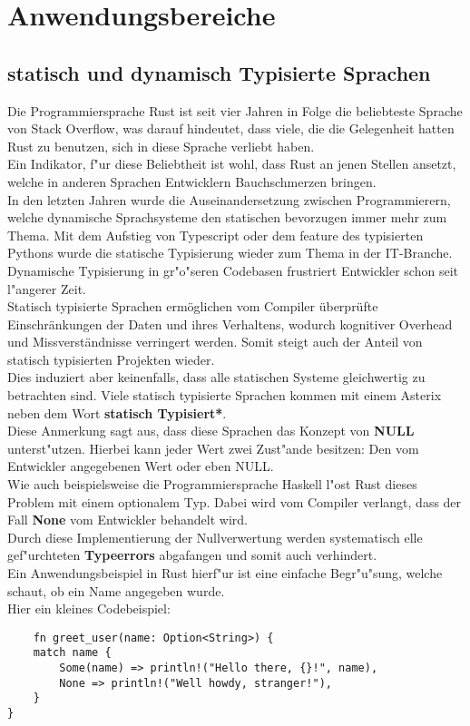 \chapter{Anwendungsbereiche} %
\label{cha:Anwendungsbereiche}
\section{statisch und dynamisch Typisierte Sprachen}
Die Programmiersprache Rust ist seit vier Jahren in Folge die beliebteste Sprache von Stack Overflow, was darauf hindeutet, dass viele, die die Gelegenheit hatten Rust zu benutzen, sich in diese Sprache verliebt haben. \autocite{so-rust-loved}\\
Ein Indikator, f"ur diese Beliebtheit ist wohl, dass Rust an jenen Stellen ansetzt, welche in anderen Sprachen Entwicklern Bauchschmerzen bringen.\\
In den letzten Jahren wurde die Auseinandersetzung zwischen Programmierern, welche dynamische Sprachsysteme den statischen bevorzugen immer mehr zum Thema. Mit dem Aufstieg von Typescript oder dem feature des typisierten Pythons wurde die statische Typisierung wieder zum Thema in der IT-Branche.\\
Dynamische Typisierung in gr"o"seren Codebasen frustriert Entwickler schon seit l"angerer Zeit. \\
Statisch typisierte Sprachen ermöglichen vom Compiler überprüfte Einschränkungen der Daten und ihres Verhaltens, wodurch kognitiver Overhead und Missverständnisse verringert werden. Somit steigt auch der Anteil von statisch typisierten Projekten wieder. \\
Dies induziert aber keinenfalls, dass alle statischen Systeme gleichwertig zu betrachten sind. Viele statisch typisierte Sprachen kommen mit einem Asterix neben dem Wort \textbf{statisch Typisiert*}.\\
Diese Anmerkung sagt aus, dass diese Sprachen das Konzept von \textbf{NULL} unterst"utzen.
Hierbei kann jeder Wert zwei Zust"ande besitzen: Den vom Entwickler angegebenen Wert oder eben NULL. \\
Wie auch beispielsweise die Programmiersprache Haskell l"ost Rust dieses Problem mit einem optionalem Typ. Dabei wird vom Compiler verlangt, dass der Fall \textbf{None} vom Entwickler behandelt wird.\\
Durch diese Implementierung der Nullverwertung werden systematisch elle gef"urchteten \textbf{Typeerrors} abgafangen und somit auch verhindert.\\
Ein Anwendungsbeispiel in Rust hierf"ur ist eine einfache Begr"u"sung, welche schaut, ob ein Name angegeben wurde.\\
Hier ein kleines Codebeispiel:
\newpage
\begin{verbatim}
    fn greet_user(name: Option<String>) {
    match name {
        Some(name) => println!("Hello there, {}!", name),
        None => println!("Well howdy, stranger!"),
    }
}

 \end{verbatim}

